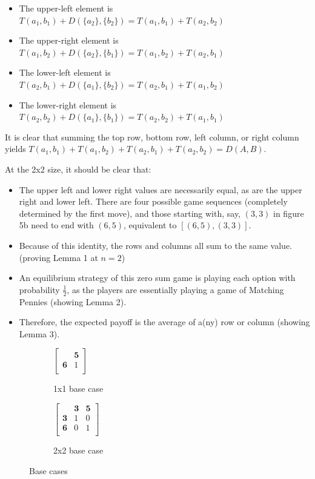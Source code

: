 \documentclass[11pt, oneside]{article} 	%
\begin{document}
\begin{itemize}
\item The upper-left element is $T(a_1, b_1) + D(\{a_2\}, \{b_2\}) = T(a_1, b_1) + T(a_2, b_2)$
\item The upper-right element is $T(a_1, b_2) + D(\{a_2\}, \{b_1\}) = T(a_1, b_2) + T(a_2, b_1)$
\item The lower-left element is $T(a_2, b_1) + D(\{a_1\}, \{b_2\}) = T(a_2, b_1) + T(a_1, b_2)$
\item The lower-right element is $T(a_2, b_2) + D(\{a_1\}, \{b_1\}) = T(a_2, b_2) + T(a_1, b_1)$
\end{itemize}

It is clear that summing the top row, bottom row, left column, or right column yields $T(a_1, b_1) + T(a_1, b_2) + T(a_2, b_1) + T(a_2, b_2) = D(A,B)$. 

At the 2x2 size, it should be clear that:
\begin{itemize}
\item The upper left and lower right values are necessarily equal, as are the upper right and lower left. There are four possible game sequences (completely determined by the first move), and those starting with, say, $(3,3)$ in figure 5b need to end with $(6,5)$, equivalent to $[(6,5), (3,3)]$.
\item Because of this identity, the rows and columns all sum to the same value. (proving Lemma 1 at $n=2$)
\item An equilibrium strategy of this zero sum game is playing each option with probability $\frac{1}{2}$, as the players are essentially playing a game of Matching Pennies\cite{1} (showing Lemma 2).
\item Therefore, the expected payoff is the average of a(ny) row or column (showing Lemma 3).
\end{itemize}



\begin{figure}
\centering
\begin{subfigure}{.5\textwidth}
 \centering
 

$ \left[\begin{array}{cc}
            & \mathbf{5}\\ 
            \mathbf{6} & 1\\
           \end{array}\right] 
$

 \caption{1x1 base case}
\label{fig:basecase_1x1}
\end{subfigure}
\begin{subfigure}{.5\textwidth}
 \centering

$ \left[\begin{array}{ccc}
            & \mathbf{3} & \mathbf{5}\\ 
            \mathbf{3} & 1 & 0\\
            \mathbf{6} & 0 & 1\\
           \end{array}\right] 
$
 \caption{2x2 base case}
\label{fig:basecase_1x1}
\end{subfigure}
\caption{Base cases}
\label{fig:base}
\end{figure}
\end{document}
